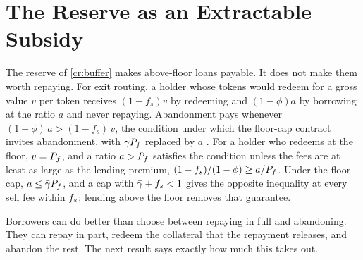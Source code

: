 \section{The Reserve as an Extractable Subsidy}\label{sec:subsidy}

The reserve of \cref{cr:buffer} makes above-floor loans payable. It does not make them worth repaying. For exit routing, a holder whose tokens would redeem for a gross value $v$ per token receives $(1-f_s)v$ by redeeming and $(1-\phi)a$ by borrowing at the ratio $a$ and never repaying. Abandonment pays whenever $(1-\phi)\,a>(1-f_s)\,v$, the condition under which the floor-cap contract invites abandonment, with $\gamma P_f$ replaced by $a$ \citep{extended}. For a holder who redeems at the floor, $v=P_f$, and a ratio $a>P_f$ satisfies the condition unless the fees are at least as large as the lending premium, $(1-f_s)/(1-\phi)\ge a/P_f$. Under the floor cap, $a\le\bar\gamma P_f$, and a cap with $\bar\gamma+\bar f_s<1$ gives the opposite inequality at every sell fee within $\bar f_s$; lending above the floor removes that guarantee.

Borrowers can do better than choose between repaying in full and abandoning. They can repay in part, redeem the collateral that the repayment releases, and abandon the rest. The next result says exactly how much this takes out.

